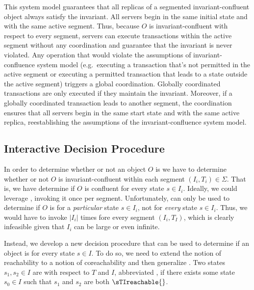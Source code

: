 This system model guarantees that all replicas of a segmented
invariant-confluent object always satisfy the invariant. All servers begin in
the same initial state and with the same active segment. Thus, because $O$ is
invariant-confluent with respect to every segment, servers can execute
transactions within the active segment without any coordination and guarantee
that the invariant is never violated. Any operation that would violate the
assumptions of invariant-confluence system model (e.g.\ executing a transaction
that's not permitted in the active segment or executing a permitted transaction
that leads to a state outside the active segment) triggers a global
coordination. Globally coordinated transactions are only executed if they
maintain the invariant. Moreover, if a globally coordinated transaction leads
to another segment, the coordination ensures that all servers begin in the same
start state and with the same active replica, reestablishing the assumptions of
the invariant-confluence system model.

\subsection{Interactive Decision Procedure}
In order to determine whether or not an object $O$ is \sTISconfluent{} we have
to determine whether or not $O$ is invariant-confluent within each segment
$(I_i, T_i) \in \Sigma$. That is, we have determine if $O$ is
 confluent for every state $s \in I_i$. Ideally, we
could leverage , invoking it once per
segment. Unfortunately,  can only be used
to determine if $O$ is  for a \emph{particular} state
$s \in I_i$, not for \emph{every} state $s \in I_i$. Thus, we would have to
invoke  $|I_i|$ times fore every segment
$(I_i, T_I)$, which is clearly infeasible given that $I_i$ can be large or even
infinite.

Instead, we develop a new decision procedure that can be used to determine if
an object is  for every state $s \in I$. To do so, we
need to extend the notion of reachability to a notion of coreachability and
then generalize . Two states $s_1, s_2
\in I$ are  with respect to $T$ and $I$, abbreviated
, if there exists some state $s_0 \in I$
such that $s_1$ and $s_2$ are both $\sTIreachable{}$.

